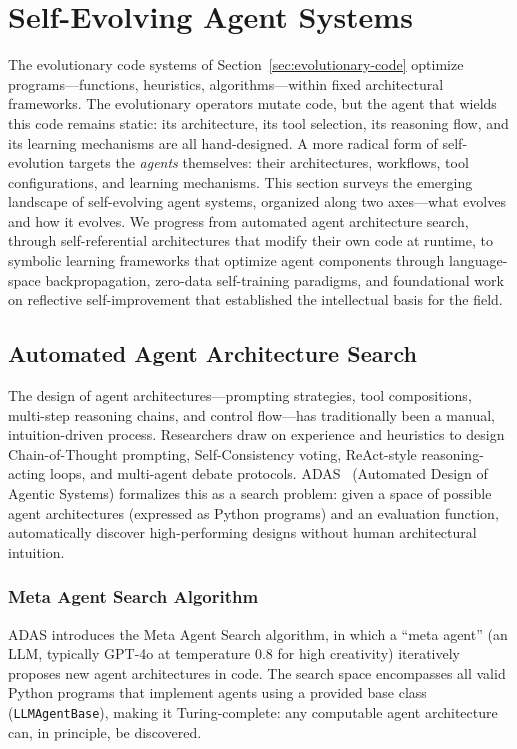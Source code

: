 \section{Self-Evolving Agent Systems}
\label{sec:agent-evolution}

The evolutionary code systems of Section~\ref{sec:evolutionary-code} optimize programs---functions, heuristics, algorithms---within fixed architectural frameworks. The evolutionary operators mutate code, but the agent that wields this code remains static: its architecture, its tool selection, its reasoning flow, and its learning mechanisms are all hand-designed. A more radical form of self-evolution targets the \emph{agents} themselves: their architectures, workflows, tool configurations, and learning mechanisms. This section surveys the emerging landscape of self-evolving agent systems, organized along two axes---what evolves and how it evolves. We progress from automated agent architecture search, through self-referential architectures that modify their own code at runtime, to symbolic learning frameworks that optimize agent components through language-space backpropagation, zero-data self-training paradigms, and foundational work on reflective self-improvement that established the intellectual basis for the field.

\subsection{Automated Agent Architecture Search}
\label{sec:adas}

The design of agent architectures---prompting strategies, tool compositions, multi-step reasoning chains, and control flow---has traditionally been a manual, intuition-driven process. Researchers draw on experience and heuristics to design Chain-of-Thought prompting, Self-Consistency voting, ReAct-style reasoning-acting loops, and multi-agent debate protocols. ADAS~\citep{hu2024adas} (Automated Design of Agentic Systems) formalizes this as a search problem: given a space of possible agent architectures (expressed as Python programs) and an evaluation function, automatically discover high-performing designs without human architectural intuition.

\subsubsection{Meta Agent Search Algorithm}

ADAS introduces the Meta Agent Search algorithm, in which a ``meta agent'' (an LLM, typically GPT-4o at temperature 0.8 for high creativity) iteratively proposes new agent architectures in code. The search space encompasses all valid Python programs that implement agents using a provided base class (\texttt{LLMAgentBase}), making it Turing-complete: any computable agent architecture can, in principle, be discovered.

